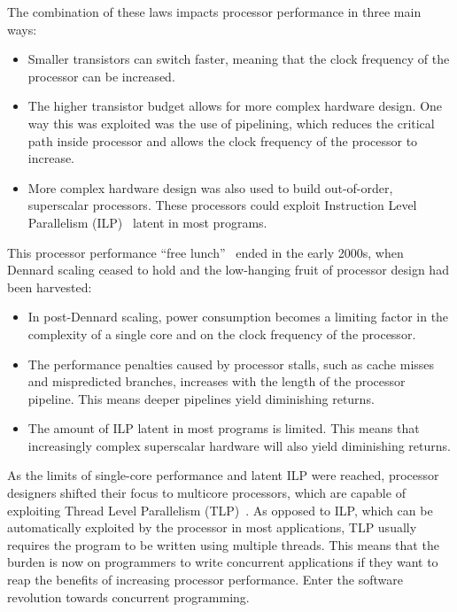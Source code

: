 \documentclass[12pt,a4paper,oneside,openright]{report}
\begin{document}
The combination of these laws impacts processor performance in three
main ways:

\begin{itemize}
\item Smaller transistors can switch faster, meaning that the clock
  frequency of the processor can be increased.
  
\item The higher transistor budget allows for more complex hardware
  design. One way this was exploited was the use of pipelining, which
  reduces the critical path inside processor and allows the clock
  frequency of the processor to increase.
  
\item More complex hardware design was also used to build
  out-of-order, superscalar processors. These processors could exploit
  Instruction Level Parallelism (ILP)~\cite[Chapter~3]{CompArchBook}
  latent in most programs.
\end{itemize}
This processor performance ``free lunch''~\cite{FreeLunchIsOver} ended
in the early 2000s, when Dennard scaling ceased to hold and the
low-hanging fruit of processor design had been harvested:

\begin{itemize}
\item In post-Dennard scaling, power consumption becomes a limiting
  factor in the complexity of a single core and on the clock frequency
  of the processor.
  
\item The performance penalties caused by processor stalls, such as
  cache misses and mispredicted branches, increases with the length of
  the processor pipeline. This means deeper pipelines yield
  diminishing returns.
  
\item The amount of ILP latent in most programs is limited. This means
  that increasingly complex superscalar hardware will also yield
  diminishing returns.
\end{itemize}
As the limits of single-core performance and latent ILP were reached,
processor designers shifted their focus to multicore processors, which
are capable of exploiting Thread Level Parallelism
(TLP)~\cite[Chapter~5]{CompArchBook}. As opposed to ILP, which can be
automatically exploited by the processor in most applications, TLP
usually requires the program to be written using multiple
threads. This means that the burden is now on programmers to write
concurrent applications if they want to reap the benefits of
increasing processor performance. Enter the software revolution
towards concurrent programming.
\end{document}
